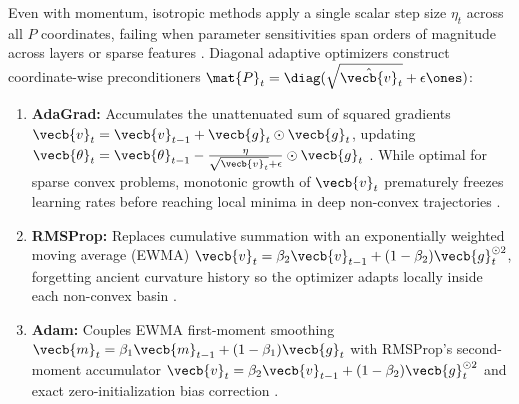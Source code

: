 \documentclass[../../../../master.tex]{subfiles}
\begin{document}
Even with momentum, isotropic methods apply a single scalar step size $\eta_t$ across all $P$ coordinates, failing when parameter sensitivities span orders of magnitude across layers or sparse features  . Diagonal adaptive optimizers construct coordinate-wise preconditioners $\mat{P}_t = \diag(\sqrt{\hat{\vecb{v}}_t} + \epsilon\ones)$:
\begin{enumerate}
  \item \textbf{AdaGrad:} Accumulates the unattenuated sum of squared gradients $\vecb{v}_t = \vecb{v}_{t-1} + \vecb{g}_t \odot \vecb{g}_t$, updating $\vecb{\theta}_t = \vecb{\theta}_{t-1} - \frac{\eta}{\sqrt{\vecb{v}_t} + \epsilon} \odot \vecb{g}_t$  . While optimal for sparse convex problems, monotonic growth of $\vecb{v}_t$ prematurely freezes learning rates before reaching local minima in deep non-convex trajectories  .
  \item \textbf{RMSProp:} Replaces cumulative summation with an exponentially weighted moving average (EWMA) $\vecb{v}_t = \beta_2 \vecb{v}_{t-1} + (1 - \beta_2)\vecb{g}_t^{\odot 2}$, forgetting ancient curvature history so the optimizer adapts locally inside each non-convex basin  .
  \item \textbf{Adam:} Couples EWMA first-moment smoothing $\vecb{m}_t = \beta_1 \vecb{m}_{t-1} + (1-\beta_1)\vecb{g}_t$ with RMSProp's second-moment accumulator $\vecb{v}_t = \beta_2 \vecb{v}_{t-1} + (1-\beta_2)\vecb{g}_t^{\odot 2}$ and exact zero-initialization bias correction  .
\end{enumerate}
\end{document}
